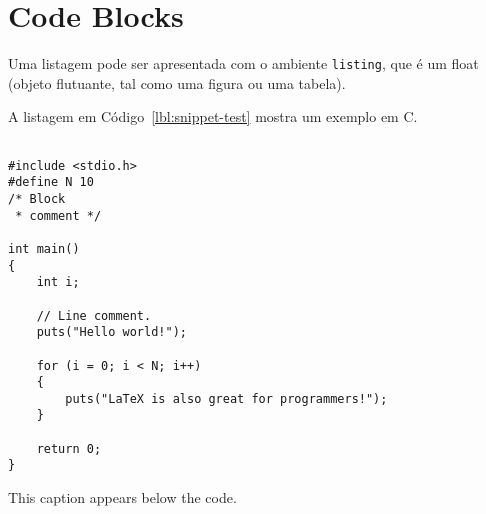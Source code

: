 \section{Code Blocks}
Uma listagem pode ser apresentada com o ambiente \texttt{listing}, que é um float (objeto flutuante, tal como uma figura ou uma tabela).

A listagem em Código~\ref{lbl:snippet-test} mostra um exemplo em C.

\begin{listing}[h]
\begin{verbatim}

#include <stdio.h>
#define N 10
/* Block
 * comment */
 
int main()
{
    int i;
 
    // Line comment.
    puts("Hello world!");
 
    for (i = 0; i < N; i++)
    {
        puts("LaTeX is also great for programmers!");
    }
 
    return 0;
}
\end{verbatim}
\caption{This caption appears below the code.}
\label{lbl:snippet-test}
\end{listing}


